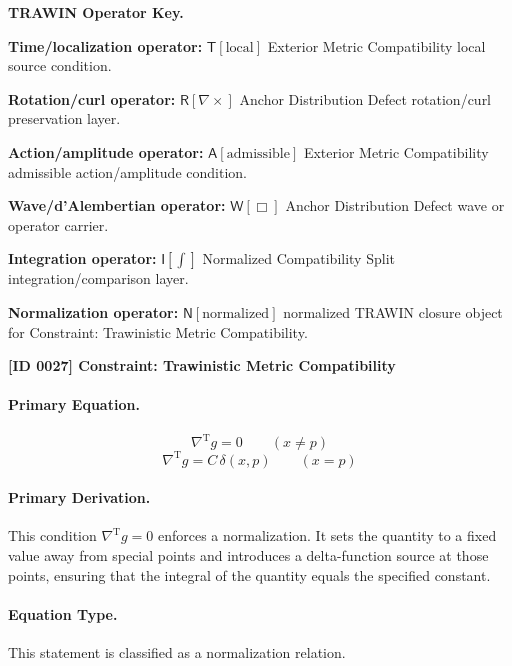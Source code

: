 \par\vspace{0.45\baselineskip}
\noindent\begin{minipage}[t]{\linewidth}
\begingroup
\small
\raggedright
\textbf{TRAWIN Operator Key.}\par
\noindent\textbf{Time/localization operator:} $\mathsf{T}\!\left[\mathrm{local}\right]$ Exterior Metric Compatibility local source condition.\par
\noindent\textbf{Rotation/curl operator:} $\mathsf{R}\!\left[\nabla\times\right]$ Anchor Distribution Defect rotation/curl preservation layer.\par
\noindent\textbf{Action/amplitude operator:} $\mathsf{A}\!\left[\mathrm{admissible}\right]$ Exterior Metric Compatibility admissible action/amplitude condition.\par
\noindent\textbf{Wave/d'Alembertian operator:} $\mathsf{W}\!\left[\Box\right]$ Anchor Distribution Defect wave or operator carrier.\par
\noindent\textbf{Integration operator:} $\mathsf{I}\!\left[\int\right]$ Normalized Compatibility Split integration/comparison layer.\par
\noindent\textbf{Normalization operator:} $\mathsf{N}\!\left[\mathrm{normalized}\right]$ normalized TRAWIN closure object for Constraint: Trawinistic Metric Compatibility.\par
\endgroup
\end{minipage}

\clearpage
\noindent\textbf{[ID 0027] Constraint: Trawinistic Metric Compatibility}\par
\vspace{0.35em}
\paragraph{Primary Equation.}
\[
\nabla^{\mathrm{T}} g = 0
\qquad (x\neq p)
\]
\[
\nabla^{\mathrm{T}} g = C\,\delta(x,p)
\qquad (x=p)
\]

\paragraph{Primary Derivation.}
This condition \( \nabla^{\mathrm{T}} g = 0 \) enforces a normalization. It sets the quantity to a fixed value away from special points and introduces a delta-function source at those points, ensuring that the integral of the quantity equals the specified constant.
\paragraph{Equation Type.}
This statement is classified as a normalization relation.


